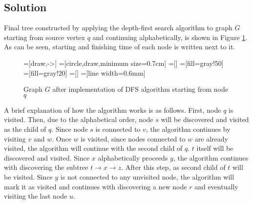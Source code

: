 \subsection*{Solution}
Final tree constructed by applying the depth-first search algorithm to graph $G$ starting from source vertex $q$ and continuing alphabetically, is shown in Figure \ref{fig52}. As can be seen, starting and finishing time of each node is written next to it.

\begin{figure}[H]\centering
{}=[draw,->]
=[circle,draw,minimum size=0.7cm]
=[]
=[fill=gray!50]
=[fill=gray!20]
=[]
=[line width=0.6mm]
\caption{Graph $G$ after implementation of DFS algorithm starting from node $q$}\label{fig52}
\end{figure}

A brief explanation of how the algorithm works is as follows. First, node $q$ is visited. Then, due to the alphabetical order, node $s$ will be discovered and visited as the child of $q$. Since node $s$ is connected to $v$, the algorithm continues by visiting $v$ and $w$. Once $w$ is visited, since nodes connected to $w$ are already visited, the algorithm will continue with the second child of $q$. $t$ itself will be discovered and visited. Since $x$ alphabetically proceeds $y$, the algorithm continues with discovering the subtree $t \rightarrow x \rightarrow z$. After this step, as second child of $t$ will be visited. Since $y$ is not connected to any unvisited node, the algorithm will mark it as visited and continues with discovering a new node $r$ and eventually visiting the last node $u$.

